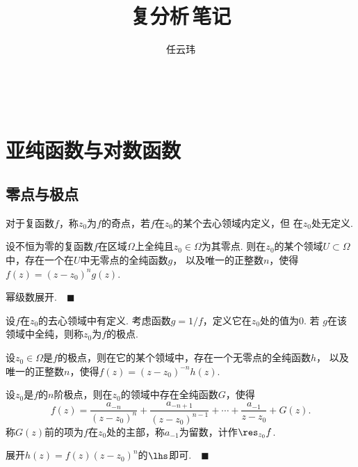 

\title{复分析$\,$笔记}
\author{任云玮}
\date{}



\maketitle
\tableofcontents

\newpage

 
\newpage


\newpage
\section{亚纯函数与对数函数}

\subsection{零点与极点}

  \begin{defi}[奇点]
    对于复函数$f$，称$z_0$为$f$的奇点，若$f$在$z_0$的某个去心领域内定义，但
    在$z_0$处无定义.
  \end{defi}

  \begin{thm}
    设不恒为零的复函数$f$在区域$\Omega$上全纯且$z_0\in\Omega$为其零点.
    则在$z_0$的某个领域$U\subset\Omega$中，存在一个在$U$中无零点的全纯函数$g$，
    以及唯一的正整数$n$，使得$f(z)=(z-z_0)^ng(z)$.
  \end{thm}
  \proof
    幂级数展开.$\quad\blacksquare$

  \begin{defi}[极点]
    设$f$在$z_0$的去心领域中有定义. 考虑函数$g=1/f$，定义它在$z_0$处的值为$0$. 若
    $g$在该领域中全纯，则称$z_0$为$f$的极点.
  \end{defi}

  \begin{thm}
    设$z_0\in\Omega$是$f$的极点，则在它的某个领域中，存在一个无零点的全纯函数$h$，
    以及唯一的正整数$n$，使得$f(z)=(z-z_0)^{-n}h(z)$.
  \end{thm}

  \begin{thm}
    \label{thm: 极点展开}
    设$z_0$是$f$的$n$阶极点，则在$z_0$的领域中存在全纯函数$G$，使得
    \[
      f(z) = \frac{a_{-n}}{(z-z_0)^n} + \frac{a_{-n+1}}{(z-z_0)^{n-1}} + \cdots +
      \frac{a_{-1}}{z-z_0} + G(z).
    \]
    称$G(z)$前的项为$f$在$z_0$处的主部，称$a_{-1}$为留数，计作$\res_{z_0}f$.
  \end{thm}
  \proof
    展开$h(z)=f(z)(z-z_0)^n$的$\lhs$即可.$\quad\blacksquare$

